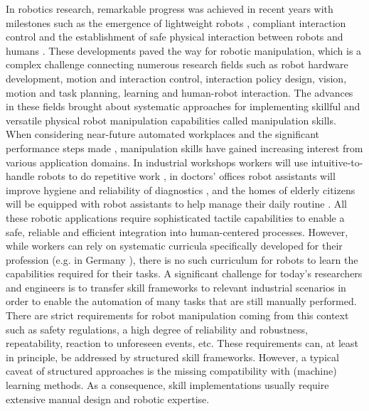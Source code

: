 In robotics research, remarkable progress was achieved in recent years with milestones such as the emergence of lightweight robots \cite{Hirzinger.2002,AlbuSchaffer.2007b,Bischoff.2010,campeau2019kinova,Haddadin.2022}, compliant interaction control \cite{Hogan.1985,AlbuSchaffer.2002,AlbuSchaffer.2007,li2018force} and the establishment of safe physical interaction between robots and humans \cite{Luca.2007,Haddadin.2017b}.
These developments paved the way for robotic manipulation, which is a complex challenge connecting numerous research fields such as robot hardware development, motion and interaction control, interaction policy design, vision, motion and task planning, learning and human-robot interaction.
The advances in these fields brought about systematic approaches for implementing skillful and versatile physical robot manipulation capabilities called manipulation skills.
When considering near-future automated workplaces and the significant performance steps made \cite{Pedersen.2016, Indri.2018}, manipulation skills have gained increasing interest from various application domains. In industrial workshops workers will use intuitive-to-handle robots to do repetitive work \cite{Johannsmeier.2017}, in doctors' offices robot assistants will improve hygiene and reliability of diagnostics \cite{Grischke.2019,seidita2021robots}, and the homes of elderly citizens will be equipped with robot assistants to help manage their daily routine \cite{martinez2018personal,trobinger2021introducing}.
All these robotic applications require sophisticated tactile capabilities to enable a safe, reliable and efficient integration into human-centered processes. However, while workers can rely on systematic curricula specifically developed for their profession (e.g. in Germany \cite{zinggeler2010educational}), there is no such curriculum for robots to learn the capabilities required for their tasks.
A significant challenge for today's researchers and engineers is to transfer skill frameworks to relevant industrial scenarios in order to enable the automation of many tasks that are still manually performed.
There are strict requirements for robot manipulation coming from this context such as safety regulations, a high degree of reliability and robustness, repeatability, reaction to unforeseen events, etc.
These requirements can, at least in principle, be addressed by structured skill frameworks.
However, a typical caveat of structured approaches is the missing compatibility with (machine) learning methods.
As a consequence, skill implementations usually require extensive manual design and robotic expertise.
